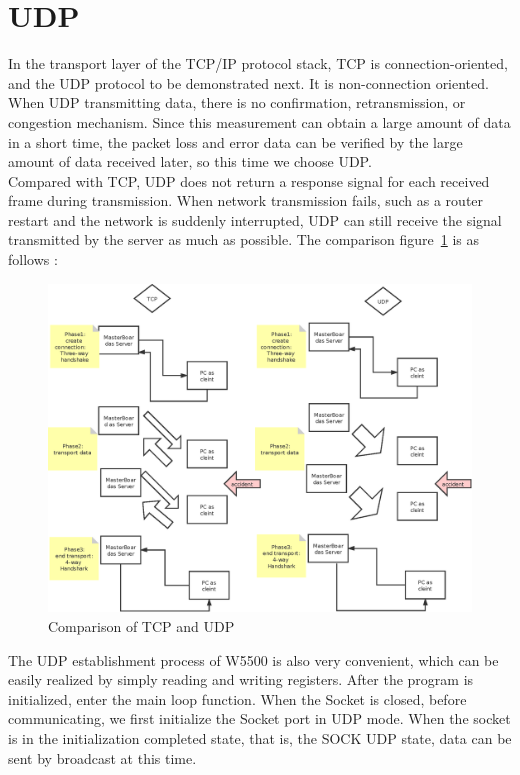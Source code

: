 \section{UDP}
\label{sec:UDP}
In the transport layer of the TCP/IP protocol stack, TCP is connection-oriented, and the UDP protocol to be demonstrated next. It is non-connection oriented.
\\
When UDP transmitting data, there is no confirmation, retransmission, or congestion mechanism. Since this measurement can obtain a large amount of data in a short time, the packet loss and error data can be verified by the large amount of data received later, so this time we choose UDP.
\\
Compared with TCP, UDP does not return a response signal for each received frame during transmission. When network transmission fails, such as a router restart and the network is suddenly interrupted, UDP can still receive the signal transmitted by the server as much as possible. The comparison figure~\ref{fig:2.11}  is as follows :
\begin{figure}[!ht]
	\centering
	\includegraphics[scale=0.7]{grafiken/2.11.eps}
	\caption{Comparison of TCP and UDP} 
	\label{fig:2.11}
\end{figure}
\FloatBarrier
The UDP establishment process of W5500 is also very convenient, which can be easily realized by simply reading and writing registers. After the program is initialized, enter the main loop function. When the Socket is closed, before communicating, we first initialize the Socket port in UDP mode. When the socket is in the initialization completed state, that is, the SOCK UDP state, data can be sent by broadcast at this time.
